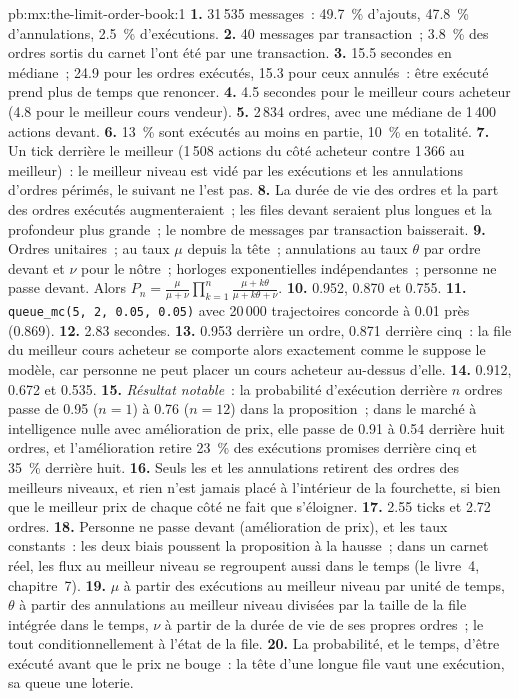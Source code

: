 \begin{solution}{pb:mx:the-limit-order-book:1}
\textbf{1.} 31\,535 messages~: 49.7~\% d'ajouts, 47.8~\% d'annulations, 2.5~\% d'exécutions.
\textbf{2.} 40 messages par transaction~; 3.8~\% des ordres sortis du carnet l'ont été par une transaction.
\textbf{3.} 15.5 secondes en médiane~; 24.9 pour les ordres exécutés, 15.3 pour ceux annulés~: être exécuté prend plus de temps que renoncer.
\textbf{4.} 4.5 secondes pour le meilleur cours acheteur (4.8 pour le meilleur cours vendeur).
\textbf{5.} 2\,834 ordres, avec une médiane de 1\,400 actions devant.
\textbf{6.} 13~\% sont exécutés au moins en partie, 10~\% en totalité.
\textbf{7.} Un tick derrière le meilleur (1\,508 actions du côté acheteur contre 1\,366 au meilleur)~: le meilleur niveau est vidé par les exécutions et les
annulations d'ordres périmés, le suivant ne l'est pas.
\textbf{8.} La durée de vie des ordres et la part des ordres exécutés augmenteraient~; les files devant seraient plus longues et la profondeur plus grande~; le nombre de messages par transaction baisserait.
\textbf{9.} Ordres unitaires~;  au taux $\mu$ depuis la tête~; annulations au taux $\theta$ par ordre devant et $\nu$ pour le nôtre~; horloges exponentielles
indépendantes~; personne ne passe devant. Alors $P_n=\tfrac{\mu}{\mu+\nu}\prod_{k=1}^{n}\tfrac{\mu+k\theta}{\mu+k\theta+\nu}$.
\textbf{10.} 0.952, 0.870 et 0.755.
\textbf{11.} \texttt{queue\_mc(5, 2, 0.05, 0.05)} avec 20\,000 trajectoires concorde à 0.01 près (0.869).
\textbf{12.} 2.83 secondes.
\textbf{13.} 0.953 derrière un ordre, 0.871 derrière cinq~: la file du meilleur cours acheteur se comporte alors exactement comme le suppose le modèle, car personne ne peut placer
un cours acheteur au-dessus d'elle.
\textbf{14.} 0.912, 0.672 et 0.535.
\textbf{15.} \emph{Résultat notable}~: la probabilité d'exécution derrière $n$ ordres passe de 0.95 ($n=1$) à 0.76 ($n=12$) dans la proposition~; dans le marché
à intelligence nulle avec amélioration de prix, elle passe de 0.91 à 0.54 derrière huit ordres, et l'amélioration retire 23~\% des exécutions promises derrière
cinq et 35~\% derrière huit.
\textbf{16.} Seuls les  et les annulations retirent des ordres des meilleurs niveaux, et rien n'est jamais placé à l'intérieur de la fourchette, si bien que le meilleur prix de chaque côté
ne fait que s'éloigner.
\textbf{17.} 2.55 ticks et 2.72 ordres.
\textbf{18.} Personne ne passe devant (amélioration de prix), et les taux constants~: les deux biais poussent la proposition à la hausse~; dans un carnet réel, les flux au meilleur niveau
se regroupent aussi dans le temps (le livre~4, chapitre~7).
\textbf{19.} $\mu$ à partir des exécutions au meilleur niveau par unité de temps, $\theta$ à partir des annulations au meilleur niveau divisées par la taille de la file intégrée dans le temps,
$\nu$ à partir de la durée de vie de ses propres ordres~; le tout conditionnellement à l'état de la file.
\textbf{20.} La probabilité, et le temps, d'être exécuté avant que le prix ne bouge~: la tête d'une longue file vaut une exécution, sa queue une loterie.
\end{solution}

